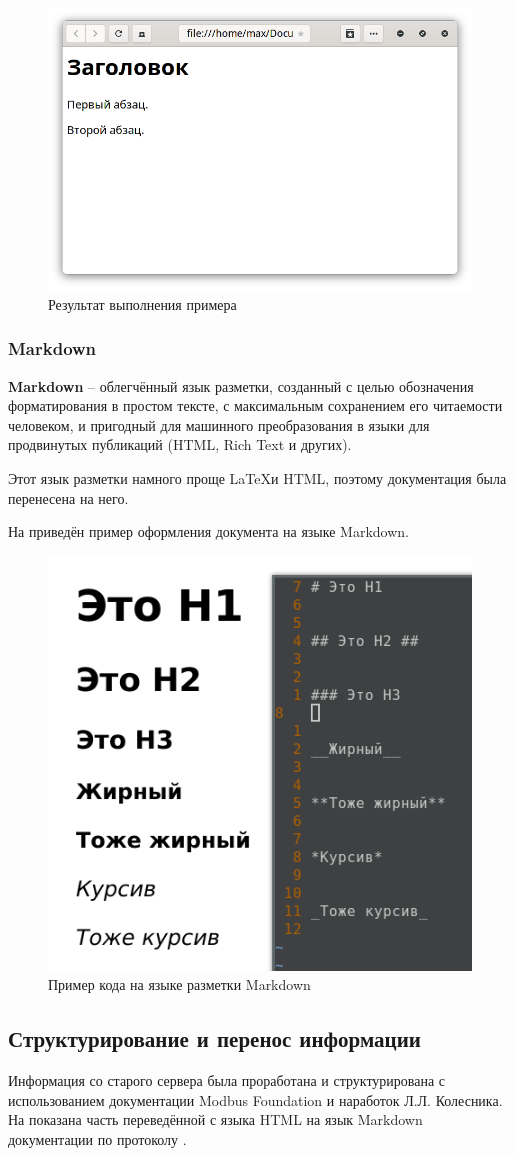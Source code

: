 \documentclass[../AISTR.tex]{subfiles}
\begin{document}
\begin{figure}[h]
	\centering
	\includegraphics[trim=2 5 2 6,clip,width=0.7\linewidth]{../images/html}
	\caption{Результат выполнения примера}
	\label{fig:html}
\end{figure}
\subsubsection{Markdown}
\textbf{Markdown} -- облегчённый язык разметки, созданный с целью обозначения форматирования в простом тексте, с максимальным сохранением его читаемости человеком, и пригодный для машинного преобразования в языки для продвинутых публикаций (HTML, Rich Text и других).

Этот язык разметки намного проще \LaTeX и HTML, поэтому документация была перенесена на него.

На  приведён пример оформления документа на языке Markdown.
\begin{figure}
	\centering
	\includegraphics[width=0.5\linewidth]{../images/md}
	\caption{Пример кода на языке разметки Markdown}
	\label{fig:md}
\end{figure}

\subsection{Структурирование и перенос информации}
Информация со старого сервера была проработана и структурирована с использованием документации Modbus Foundation и наработок Л.Л. Колесника. На  показана часть переведённой с языка HTML на язык Markdown документации по протоколу \mb.
\end{document}
